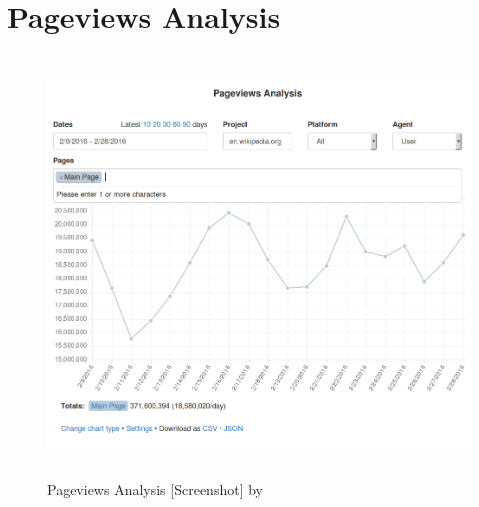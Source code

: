\section{Pageviews Analysis}
\begin{figure}[H]
	\centering
	\includegraphics[height=30em]{diagrams/page-views.png}
	\caption{Pageviews Analysis [Screenshot] by \citet{appendixDia:04}}
	\label{fig:pageviews}
\end{figure}